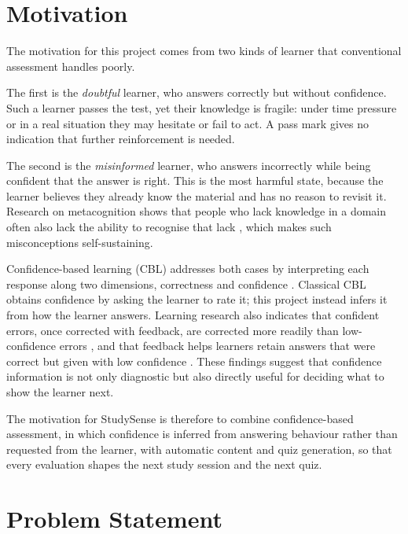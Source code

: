 \documentclass[12pt,a4paper,oneside]{report}
\begin{document}
\section{Motivation}

The motivation for this project comes from two kinds of learner that
conventional assessment handles poorly.

The first is the \emph{doubtful} learner, who answers correctly but without
confidence. Such a learner passes the test, yet their knowledge is fragile:
under time pressure or in a real situation they may hesitate or fail to
act. A pass mark gives no indication that further reinforcement is needed.

The second is the \emph{misinformed} learner, who answers incorrectly while
being confident that the answer is right. This is the most harmful state,
because the learner believes they already know the material and has no
reason to revisit it. Research on metacognition shows that people who lack
knowledge in a domain often also lack the ability to recognise that lack
\cite{kruger1999unskilled}, which makes such misconceptions self-sustaining.

Confidence-based learning (CBL) addresses both cases by interpreting each
response along two dimensions, correctness and confidence
\cite{benchprep, gardnermedwin2003}. Classical CBL obtains confidence by
asking the learner to rate it; this project instead infers it from how the
learner answers. Learning research
also indicates that confident errors, once corrected with feedback, are
corrected more readily than low-confidence errors \cite{butterfield2001},
and that feedback helps learners retain answers that were correct but given
with low confidence \cite{butler2008}. These findings suggest that
confidence information is not only diagnostic but also directly useful for
deciding what to show the learner next.

The motivation for StudySense is therefore to combine confidence-based
assessment, in which confidence is inferred from answering behaviour rather
than requested from the learner, with automatic content and quiz generation, so that every
evaluation shapes the next study session and the next quiz.

\section{Problem Statement}
\end{document}
